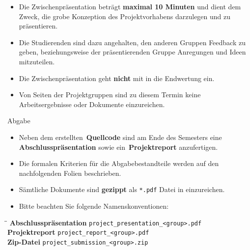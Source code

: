 \begin{frame}
	\begin{itemize}
		\item Die Zwischenpräsentation beträgt \textbf{maximal 10 Minuten} und dient dem Zweck, die grobe Konzeption des Projektvorhabens darzulegen
			und zu präsentieren.
		\item Die Studierenden sind dazu angehalten, den anderen Gruppen Feedback zu geben, beziehungsweise der präsentierenden Gruppe Anregungen
			und Ideen mitzuteilen. 
		\item Die Zwischenpräsentation geht \textbf{nicht} mit in die Endwertung ein.
		\item Von Seiten der Projektgruppen sind zu diesem Termin keine Arbeitsergebnisse oder Dokumente einzureichen.
	\end{itemize}
\end{frame}


\begin{dwHeaderFrame}{Abgabe}
	\begin{itemize}
		\item Neben dem erstellten \,\textbf{Quellcode} sind am Ende des Semesters eine \,\textbf{Abschlusspräsentation} sowie ein
			\,\textbf{Projektreport} anzufertigen.
		\item Die formalen Kriterien für die Abgabebestandteile werden auf den nachfolgenden Folien beschrieben.
		\item Sämtliche Dokumente sind \textbf{gezippt} als \texttt{*.pdf} Datei in \moodle{} einzureichen.
		\item Bitte beachten Sie folgende Namenskonventionen:
	\end{itemize}
	
	\vspace*{1mm}
	{
	\begin{tabbing}
		\hspace*{4mm}\=\hspace*{4cm}\=\kill
		\> \textbf{Abschlusspräsentation} 	\> \texttt{project\_presentation\_<group>.pdf} 	\\[1mm]
		\> \textbf{Projektreport} 			\> \texttt{project\_report\_<group>.pdf} 		\\[1mm]
		\> \textbf{Zip-Datei}				\> \texttt{project\_submission\_<group>.zip}
	\end{tabbing}}
	
	\vspace*{1mm}
\end{dwHeaderFrame}


